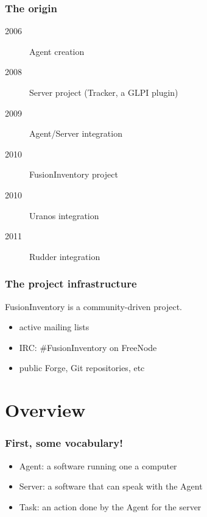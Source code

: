\documentclass{beamer}
\begin{document}
\begin{frame}
    \frametitle{The origin}

    \begin{description}
      \item[2006] Agent creation
      \item[2008] Server project (Tracker, a GLPI plugin)
      \item[2009] Agent/Server integration 
      \item[2010] FusionInventory project
      \item[2010] Uranos integration
      \item[2011] Rudder integration
    \end{description}

\end{frame}



\begin{frame}
    \frametitle{The project infrastructure}
    FusionInventory is a community-driven project.

    \begin{itemize}
        \item active mailing lists
        \item IRC: \#FusionInventory on FreeNode
        \item public Forge, Git repositories, etc
    \end{itemize}
\end{frame}

\section{Overview}

\begin{frame}
    \frametitle{First, some vocabulary!}

    \begin{itemize}
        \item Agent: a software running one a computer
        \item Server: a software that can speak with the Agent
        \item Task: an action done by the Agent for the server 
    \end{itemize}

\end{frame}
\end{document}
